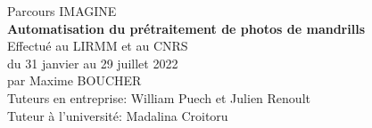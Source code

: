 \begin{titlepage}
\begin{center}
{Parcours IMAGINE \\}
\vspace{2cm}
{\huge \textbf{Automatisation du prétraitement de photos de mandrills}}\\
\vspace{2cm}
Effectué au LIRMM et au CNRS \\
\vspace{\interline}
du 31 janvier au 29 juillet 2022 \\
\vspace{\interline}
par Maxime BOUCHER\\
\vspace{2cm}
Tuteurs en entreprise: William Puech et Julien Renoult \\
\vspace{\interline}
Tuteur à l'université: Madalina Croitoru 
\end{center}
\end{titlepage}
